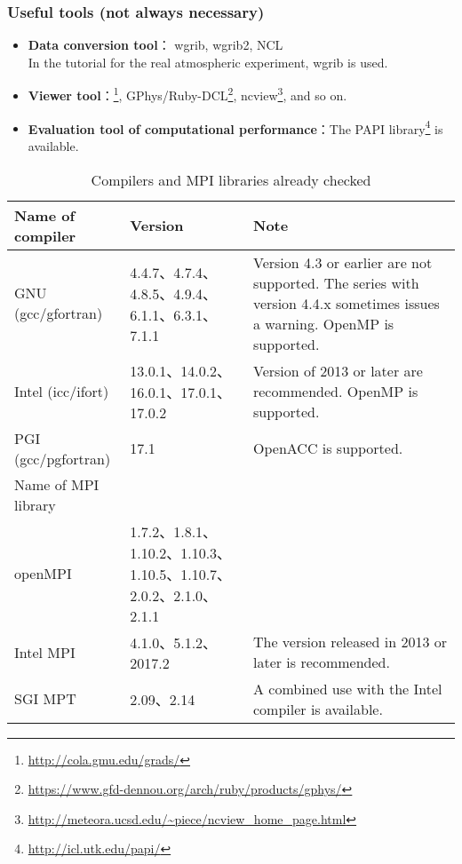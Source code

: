\subsubsection{Useful tools (not always necessary)}
\begin{itemize}
  \item {\bf Data conversion tool}： wgrib, wgrib2, NCL\\
  In the tutorial for the real atmospheric experiment, wgrib is used.
  \item {\bf Viewer tool}：\grads \footnote{\url{http://cola.gmu.edu/grads/}},
  GPhys/Ruby-DCL\footnote{\url{https://www.gfd-dennou.org/arch/ruby/products/gphys/}},
  ncview\footnote{\url{http://meteora.ucsd.edu/~piece/ncview\_home\_page.html}}, and so on.
  \item {\bf Evaluation tool of computational performance}：The PAPI library\footnote{\url{http://icl.utk.edu/papi/}} is available.
\end{itemize}


\begin{table}[tb]
\begin{center}
\caption{Compilers and MPI libraries already checked}
\begin{tabularx}{150mm}{|l|X|X|} \hline
 \rowcolor[gray]{0.9} Name of compiler & Version & Note \\ \hline
 GNU (gcc/gfortran)    & 4.4.7、4.7.4、4.8.5、4.9.4、6.1.1、6.3.1、7.1.1 & Version 4.3 or earlier are not supported. The series with version 4.4.x sometimes issues a warning. OpenMP is supported. \\ \hline
 Intel (icc/ifort)     & 13.0.1、14.0.2、16.0.1、17.0.1、17.0.2  & Version of 2013 or later are recommended. OpenMP is supported. \\ \hline
 PGI (gcc/pgfortran)   & 17.1                 & OpenACC is supported. \\ \hline
 \rowcolor[gray]{0.9} Name of MPI library &  &  \\ \hline
 openMPI   & 1.7.2、1.8.1、1.10.2、1.10.3、1.10.5、1.10.7、2.0.2、2.1.0、2.1.1 & \\ \hline
 Intel MPI & 4.1.0、5.1.2、2017.2 & The version released in 2013 or later is recommended.\\ \hline
 SGI MPT   & 2.09、2.14               & A combined use with the Intel compiler is available. \\ \hline
\end{tabularx}
\label{tab:compatible_compiler}
\end{center}
\end{table}

